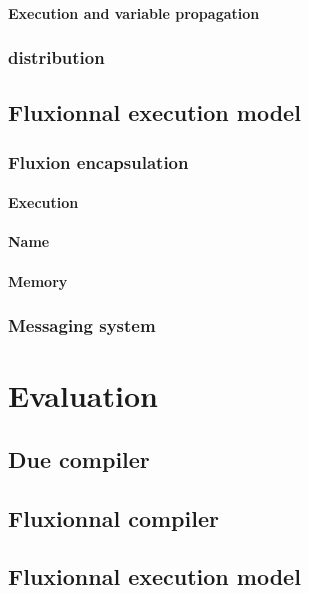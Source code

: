 \documentclass[12pt]{report}
\begin{document}
      \subsubsection{Execution and variable propagation}
    \subsection{distribution}

  \section{Fluxionnal execution model}
    \subsection{Fluxion encapsulation}
      \subsubsection{Execution}
      \subsubsection{Name}
      \subsubsection{Memory}
    \subsection{Messaging system}

\chapter{Evaluation}
  \section{Due compiler}
  \section{Fluxionnal compiler}
  \section{Fluxionnal execution model}




\printbibliography[]
\end{document}
